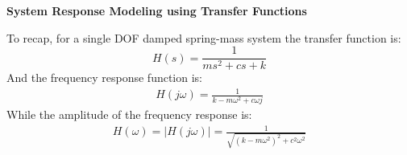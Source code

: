 \documentclass[12pt,letter]{article}
\begin{document}







\begin{review}
	
	\textbf{System Response Modeling using Transfer Functions} 

	\noindent To recap, for a single DOF damped spring-mass system the transfer function is:
	\begin{equation}
	H(s) = \frac{1}{ms^2+cs+k}
	\end{equation}
	And the frequency response function is: 
	\begin{eqnarray}
	H(j\omega) = \frac{1}{k-m\omega^2+c\omega j}
	\end{eqnarray}
	While the amplitude of the frequency response is:
	\begin{eqnarray}
	H(\omega) = |H(j\omega)| = \frac{1}{\sqrt{(k-m\omega^2)^2+c^2\omega^2}}
	\end{eqnarray}
\end{review}
\end{document}
